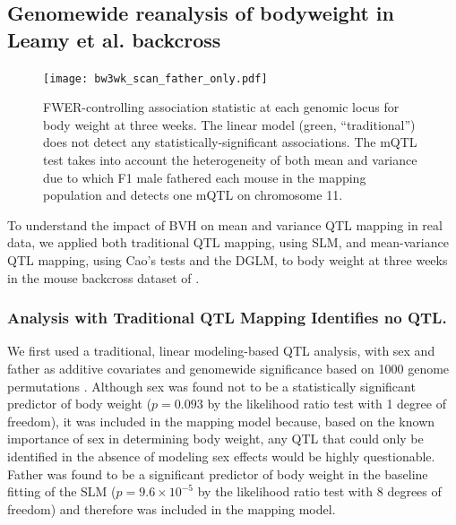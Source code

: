 \subsection{Genomewide reanalysis of bodyweight in Leamy et al. backcross}

\begin{figure}
  \texttt{[image: bw3wk\_scan\_father\_only.pdf]}
  \caption[
    FWER-controlling association statistic at each genomic locus for body weight at three weeks.
  ]
  {
    FWER-controlling association statistic at each genomic locus for body weight at three weeks.
    The linear model (green, ``traditional'') does not detect any statistically-significant associations.
    The mQTL test takes into account the heterogeneity of both mean and variance due to which F1 male fathered each mouse in the mapping population and detects one mQTL on chromosome 11.
  }
  \label{fig:genome_scan_dglm}
\end{figure}

To understand the impact of BVH on mean and variance QTL mapping in real data, we applied both traditional QTL mapping, using SLM, and mean-variance QTL mapping, using Cao's tests and the DGLM, to body weight at three weeks in the mouse backcross dataset of \citet{Leamy2000}.

\subsubsection{Analysis with Traditional QTL Mapping Identifies no QTL.}

We first used a traditional, linear modeling-based QTL analysis, with  sex and father as additive covariates and genomewide significance based on 1000 genome permutations \citep{Churchill1994}.
Although sex was found not to be a statistically significant predictor of body weight ($p = 0.093$ by the likelihood ratio test with 1 degree of freedom), it was included in the mapping model because, based on the known importance of sex in determining body weight, any QTL that could only be identified in the absence of modeling sex effects would be highly questionable.
Father was found to be a significant predictor of body weight in the baseline fitting of the SLM ($p = 9.6 \times 10^{-5}$ by the likelihood ratio test with 8 degrees of freedom) and therefore was included in the mapping model.

